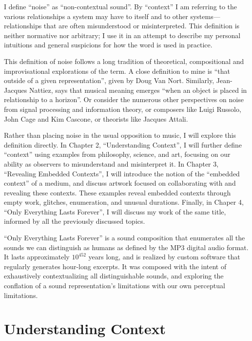 \documentclass{thesis}
\begin{document}
I define ``noise'' as ``non-contextual sound''. By ``context'' I am referring to the various relationships a system may have to itself and to other systems---relationships that are often misunderstood or misinterpreted. This definition is neither normative nor arbitrary; I use it in an attempt to describe my personal intuitions and general suspicions for how the word is used in practice.

This definition of noise follows a long tradition of theoretical, compositional and improvisational explorations of the term. A close definition to mine is ``that outside of a given representation'', given by Doug Van Nort\cite{Vannort06}. Similarly, Jean-Jacques Nattiez, says that musical meaning emerges ``when an object is placed in relationship to a horizon''\cite{nattiez_music_1990}. Or consider the numerous other perspectives on noise from signal processing and information theory, or composers like Luigi Russolo\cite{Russolo04}, John Cage\cite{Cage61} and Kim Cascone\cite{Cascone00}, or theorists like Jacques Attali\cite{Attali85}.

Rather than placing noise in the usual opposition to music, I will explore this definition directly. In Chapter 2, ``Understanding Context'', I will further define ``context'' using examples from philosophy, science, and art, focusing on our ability as observers to misunderstand and misinterpret it. In Chapter 3, ``Revealing Embedded Contexts'', I will introduce the notion of the ``embedded context'' of a medium, and discuss artwork focused on collaborating with and revealing these contexts. These examples reveal embedded contexts through empty work, glitches, enumeration, and unusual durations. Finally, in Chaper 4, ``Only Everything Lasts Forever'', I will discuss my work of the same title, informed by all the previously discussed topics.

``Only Everything Lasts Forever'' is a sound composition that enumerates all the sounds we can distinguish as humans as defined by the MP3 digital audio format. It lasts approximately $10^{452}$ years long, and is realized by custom software that regularly generates hour-long excerpts. It was composed with the intent of exhaustively contextualizing all distinguishable sounds, and exploring the conflation of a sound representation's limitations with our own perceptual limitations.

\chapter{Understanding Context}
\end{document}
